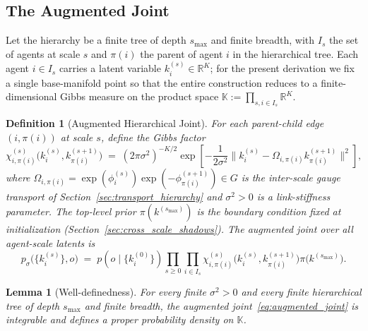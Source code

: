 \documentclass[11pt]{article}
\newtheorem{lemma}{Lemma}
\newtheorem{definition}{Definition}
\begin{document}
\subsection{The Augmented Joint}

Let the hierarchy be a finite tree of depth $s_{\max}$ and finite breadth, with $I_s$ the set of agents at scale $s$ and $\pi(i)$ the parent of agent $i$ in the hierarchical tree. Each agent $i \in I_s$ carries a latent variable $k_i^{(s)} \in \mathbb{R}^K$; for the present derivation we fix a single base-manifold point so that the entire construction reduces to a finite-dimensional Gibbs measure on the product space $\mathbb{K} := \prod_{s, i \in I_s} \mathbb{R}^K$.

\begin{definition}[Augmented Hierarchical Joint]
\label{def:augmented_joint}
For each parent-child edge $(i, \pi(i))$ at scale $s$, define the Gibbs factor
\begin{equation}
\chi_{i,\pi(i)}^{(s)}\big(k_i^{(s)}, k_{\pi(i)}^{(s+1)}\big)
\;=\;
(2\pi\sigma^2)^{-K/2} \exp\!\left[-\frac{1}{2\sigma^2}
\big\|k_i^{(s)} - \Omega_{i,\pi(i)}  k_{\pi(i)}^{(s+1)}\big\|^2\right],
\label{eq:gibbs_factor}
\end{equation}
where $\Omega_{i,\pi(i)} = \exp(\phi_i^{(s)})\exp(-\phi_{\pi(i)}^{(s+1)}) \in G$ is the inter-scale gauge transport of Section~\ref{sec:transport_hierarchy} and $\sigma^2 > 0$ is a link-stiffness parameter. The top-level prior $\pi(k^{(s_{\max})})$ is the boundary condition fixed at initialization (Section~\ref{sec:cross_scale_shadows}). The augmented joint over all agent-scale latents is
\begin{equation}
p_{\sigma}\big(\{k_i^{(s)}\}, o\big)
\;=\;
p(o \mid \{k_i^{(0)}\}) \prod_{s \ge 0} \prod_{i \in I_s} \chi_{i,\pi(i)}^{(s)}\big(k_i^{(s)}, k_{\pi(i)}^{(s+1)}\big)  \pi\big(k^{(s_{\max})}\big).
\label{eq:augmented_joint}
\end{equation}
\end{definition}

\begin{lemma}[Well-definedness]
\label{lem:aug_joint_welldefined}
For every finite $\sigma^2 > 0$ and every finite hierarchical tree of depth $s_{\max}$ and finite breadth, the augmented joint~\eqref{eq:augmented_joint} is integrable and defines a proper probability density on $\mathbb{K}$.
\end{lemma}
\end{document}
